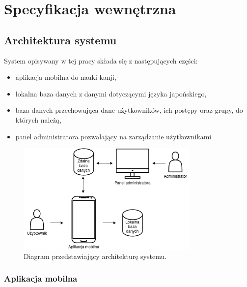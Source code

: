\documentclass[a4paper,twoside,12pt]{book}
\begin{document}
\chapter{Specyfikacja wewnętrzna}
\label{ch:05}


\section{Architektura systemu}

System opisywany w tej pracy składa się z następujących części:
\begin{itemize}
\item aplikacja mobilna do nauki kanji,
\item lokalna baza danych z danymi dotyczącymi języka japońskiego,
\item baza danych przechowująca dane użytkowników, ich postępy oraz grupy, do których należą,
\item panel administratora pozwalający na zarządzanie użytkownikami
\end{itemize}

\begin{figure}[]
\centering
\includegraphics[width=0.8\textwidth]{archi}
\caption{Diagram przedstawiający architekturę systemu.}
\label{fig:archi}
\end{figure}

\subsection{Aplikacja mobilna}
\end{document}
